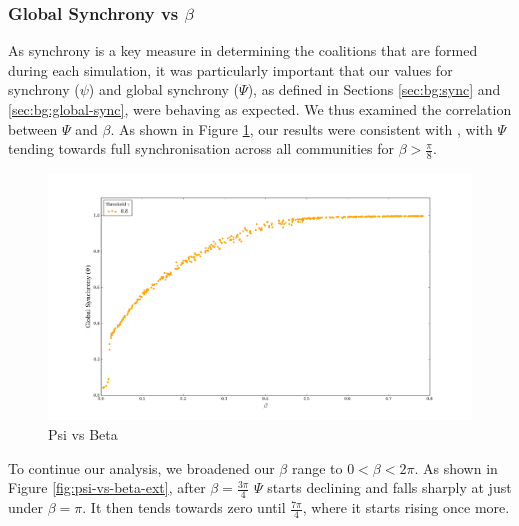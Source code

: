 \documentclass[a4paper,11pt]{article}
\begin{document}
\subsubsection{Global Synchrony vs $\beta$}
\label{sec:app:osc:res:sync-v-beta}

As synchrony is a key measure in determining the coalitions that are formed during each simulation, it was particularly important that our values for synchrony ($\psi$) and global synchrony ($\Psi$), as defined in Sections \ref{sec:bg:sync} and \ref{sec:bg:global-sync}, were behaving as expected. We thus examined the correlation between $\Psi$ and $\beta$. As shown in Figure \ref{fig:psi-vs-beta-orig}, our results were consistent with \cite{Shanahan2010}, with $\Psi$ tending towards full synchronisation across all communities for $\beta > \frac{\pi}{8}$.

\begin{figure}[H]
\begin{center}
\includegraphics[scale = 0.35]{figures/psi_vs_beta_orig}
\caption{
	Psi vs Beta
	\label{fig:psi-vs-beta-orig}
}
\end{center}
\end{figure}

To continue our analysis, we broadened our $\beta$ range to $0 < \beta < 2\pi$. As shown in Figure \ref{fig:psi-vs-beta-ext}, after $\beta = \frac{3\pi}{4}$ $\Psi$ starts declining and falls sharply at just under $\beta = \pi$. It then tends towards zero until $\frac{7\pi}{4}$, where it starts rising once more.
\end{document}
